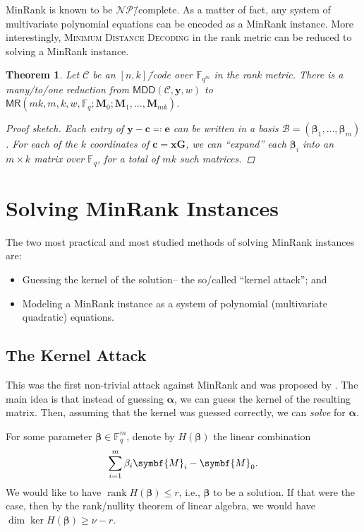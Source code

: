 \documentclass[version=last, paper=A4, parskip=half, oneside]{scrbook}
\theoremstyle{plain}
\newtheorem{theorem}{Theorem}
\theoremstyle{definition}
\theoremstyle{remark}
\renewcommand*{\vec}{\symbf}
\newcommand*{\mat}{\symbf}
\DeclareMathOperator{\rank}{rank}
\newcommand*{\FF}{\ensuremath{\mathbb{F}}}
\newcommand*{\NP}{\ensuremath{\mathcal{NP}}}
\newcommand*{\MDD}{\ensuremath{\mathsf{MDD}}}
\newcommand*{\MR}{\ensuremath{\mathsf{MR}}}
\begin{document}
MinRank is known to be \NP\=/complete.  As a matter of fact, any system of
multivariate polynomial equations can be encoded as a MinRank instance.  More
interestingly, \textsc{Minimum Distance Decoding} in the rank metric can be
reduced to solving a MinRank instance.

\begin{theorem}\label{thm:RD-to-MR}
  Let \(\mathcal{C}\) be an \([n, k]\)\=/code over \(\FF_{q^m}\) in the rank
  metric.  There is a many\-/to\-/one reduction from
  \(\MDD(\mathcal{C}, \vec{y}, w)\) to
  \(\MR(m k, m, k, w, \FF_q; \mat{M}_0; \mat{M}_1, \ldots, \mat{M}_{m k})\).
  \begin{proof}[Proof sketch]
    Each entry of \(\vec{y} - \vec{c} \eqqcolon \vec{e}\) can be written in a
    basis \(\mathcal{B} = (\vec{\beta}_1, \ldots, \vec{\beta}_m)\).  For each of
    the \(k\) coordinates of \(\vec{c} = \vec{x} \mat{G}\), we can
    \enquote{expand} each \(\vec{\beta}_i\) into an \(m \times k\) matrix over
    \(\FF_q\), for a total of \(m k\) such matrices.
  \end{proof}
\end{theorem}

\section{Solving MinRank Instances}\label{sec:MR-attacks}

The two most practical and most studied methods of solving MinRank instances
are:
\begin{itemize}
\item Guessing the kernel of the solution\--- the so\-/called \enquote{kernel
    attack}; and
\item Modeling a MinRank instance as a system of polynomial (multivariate
  quadratic) equations.
\end{itemize}

\subsection{The Kernel Attack}\label{sec:kernel-attack}

This was the first non-trivial attack against MinRank and was proposed by
\textcite{GC00}.  The main idea is that instead of guessing \(\vec{\alpha}\), we
can guess the kernel of the resulting matrix.  Then, assuming that the kernel
was guessed correctly, we can \emph{solve} for \(\vec{\alpha}\).

For some parameter \(\vec{\beta} \in \FF_q^m\), denote by \(H(\vec{\beta})\) the
linear combination
\[
  \sum_{i=1}^m \beta_i \mat{M}_i - \mat{M}_0\text.
\]
We would like to have \(\rank H(\vec{\beta}) \le r\), i.e., \(\vec{\beta}\) to
be a solution.  If that were the case, then by the rank\-/nullity theorem of
linear algebra, we would have \(\dim \ker H(\vec{\beta}) \ge \nu - r\).
\end{document}
